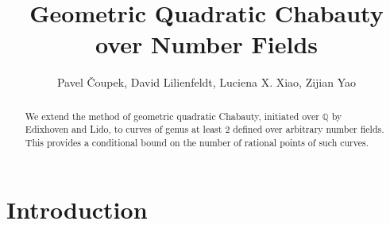 \documentclass[11pt,oneside]{amsart}
\theoremstyle{plain}
\theoremstyle{definition}
\def\Q{\mathbb{Q}}
\begin{document}
 

 \title[Geometric Quadratic Chabauty]{\small Geometric Quadratic Chabauty over Number Fields}
\author{Pavel \v{C}oupek, David Lilienfeldt, Luciena X. Xiao, Zijian Yao}
\address[Pavel \v{C}oupek]{Department of Mathematics, Purdue University}
 \address[David Lilienfeldt]{Department of Mathematics, McGill University}
 \address[Luciena X. Xiao]{Department of Mathematics, California Institute of Technology}
\address[Zijian Yao]{Department of Mathematics, Harvard University}
\maketitle

\begin{abstract}
We extend the method of geometric quadratic Chabauty, initiated over $\Q$ by Edixhoven and Lido, to curves of genus at least $2$ defined over arbitrary number fields. This provides a conditional bound on the number of rational points of such curves. %
\end{abstract}


\tableofcontents
 
\vspace*{-1cm}
\section{Introduction} 

 
\end{document}
